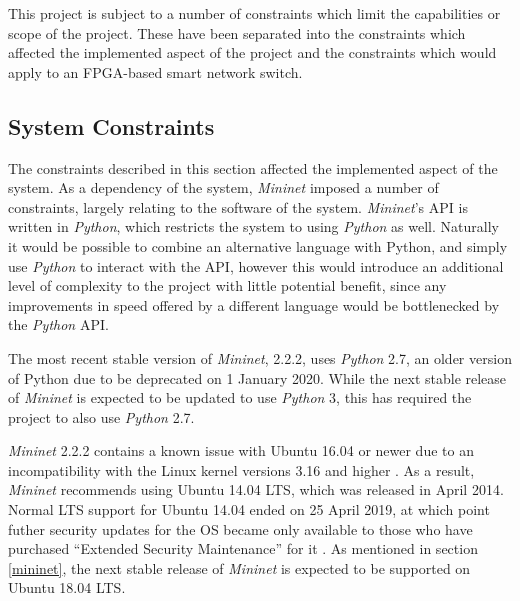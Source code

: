 
This project is subject to a number of constraints which limit the capabilities or scope of the project.
These have been separated into the constraints which affected the implemented aspect of the project and the constraints which would apply to an FPGA-based smart network switch.

\subsection{System Constraints}
The constraints described in this section affected the implemented aspect of the system. As a dependency of the system, \textit{Mininet} \cite{mininet} imposed a number of constraints, largely relating to the software of the system. \textit{Mininet}'s API is written in \textit{Python}, which restricts the system to using \textit{Python} as well. Naturally it would be possible to combine an alternative language with Python, and simply use \textit{Python} to interact with the API, however this would introduce an additional level of complexity to the project with little potential benefit, since any improvements in speed offered by a different language would be bottlenecked by the \textit{Python} API.

The most recent stable version of \textit{Mininet}, 2.2.2, uses \textit{Python} 2.7, an older version of Python due to be deprecated on 1 January 2020. While the next stable release of \textit{Mininet} is expected to be updated to use \textit{Python} 3, this has required the project to also use \textit{Python} 2.7.

\textit{Mininet} 2.2.2 contains a known issue with Ubuntu 16.04 or newer due to an incompatibility with the Linux kernel versions 3.16 and higher \cite{mininet_2_2_2_release_notes}. As a result, \textit{Mininet} recommends using Ubuntu 14.04 LTS, which was released in April 2014. Normal LTS support for Ubuntu 14.04 ended on 25 April 2019, at which point futher security updates for the OS became only available to those who have purchased ``Extended Security Maintenance'' for it \cite{ubuntu_14_04_release}. As mentioned in section \ref{mininet}, the next stable release of \textit{Mininet} is expected to be supported on Ubuntu 18.04 LTS.

